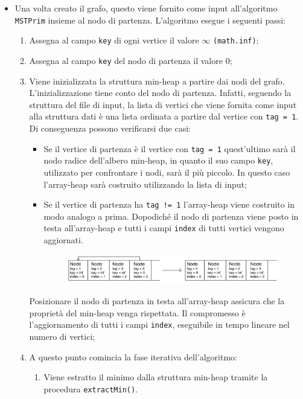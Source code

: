 \begin{itemize}
	\item Una volta creato il grafo, questo viene fornito come input all'algoritmo \texttt{MSTPrim} insieme al nodo di partenza. 
	L'algoritmo esegue i seguenti passi:
	\begin{enumerate}
		\item Assegna al campo \texttt{key} di ogni vertice il valore $\infty$ \texttt{(math.inf)};
		\item Assegna al campo \texttt{key} del nodo di partenza il valore $0$;
		\item Viene inizializzata la struttura min-heap a partire dai nodi del grafo. 
		L'inizializzazione tiene conto del nodo di partenza. 
		Infatti, seguendo la struttura del file di input, la lista di vertici che viene fornita come input alla struttura dati è una lista ordinata a partire dal vertice con \texttt{tag = 1}. 
		Di conseguenza possono verificarsi due casi:
		\begin{itemize}
			\item Se il vertice di partenza è il vertice con \texttt{tag = 1} quest'ultimo sarà il nodo radice dell'albero min-heap, in quanto il suo campo \texttt{key}, utilizzato per confrontare i nodi, sarà il più piccolo. 
			In questo caso l'array-heap sarà costruito utilizzando la lista di input;
			\item Se il vertice di partenza ha \texttt{tag != 1} l'array-heap viene costruito in modo analogo a prima. 
			Dopodiché il nodo di partenza viene posto in testa all'array-heap e tutti i campi \texttt{index} di tutti vertici vengono aggiornati.
			\begin{figure}[H]
				\hspace{-1cm}\includegraphics[width=18.5cm]{Img/arrayheap.jpg}
			\end{figure}
		\end{itemize}
		Posizionare il nodo di partenza in testa all'array-heap assicura che la proprietà del min-heap venga rispettata. 
		Il compromesso è l'aggiornamento di tutti i campi \texttt{index}, eseguibile in tempo lineare nel numero di vertici;
		\item A questo punto comincia la fase iterativa dell'algoritmo:
		\begin{enumerate}
			\item Viene estratto il minimo dalla struttura min-heap tramite la procedura \texttt{extractMin()}. 

\end{enumerate}
\end{enumerate}
\end{itemize}
